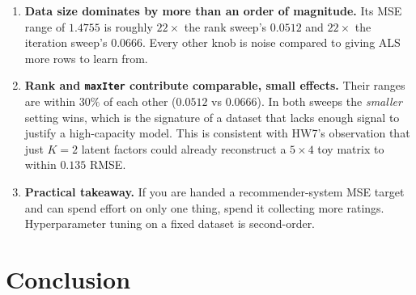 \documentclass[12pt]{article}
\begin{document}
	\begin{enumerate}
		\item \textbf{Data size dominates by more than an order of magnitude.} Its MSE range of $1.4755$ is roughly $22\times$ the rank sweep's $0.0512$ and $22\times$ the iteration sweep's $0.0666$. Every other knob is noise compared to giving ALS more rows to learn from.
		\item \textbf{Rank and \texttt{maxIter} contribute comparable, small effects.} Their ranges are within $30\%$ of each other ($0.0512$ vs $0.0666$). In both sweeps the \emph{smaller} setting wins, which is the signature of a dataset that lacks enough signal to justify a high-capacity model. This is consistent with HW7's observation that just $K=2$ latent factors could already reconstruct a $5\times 4$ toy matrix to within $0.135$ RMSE.
		\item \textbf{Practical takeaway.} If you are handed a recommender-system MSE target and can spend effort on only one thing, spend it collecting more ratings. Hyperparameter tuning on a fixed dataset is second-order.
	\end{enumerate}

	\newpage
	\section{Conclusion}
\end{document}
